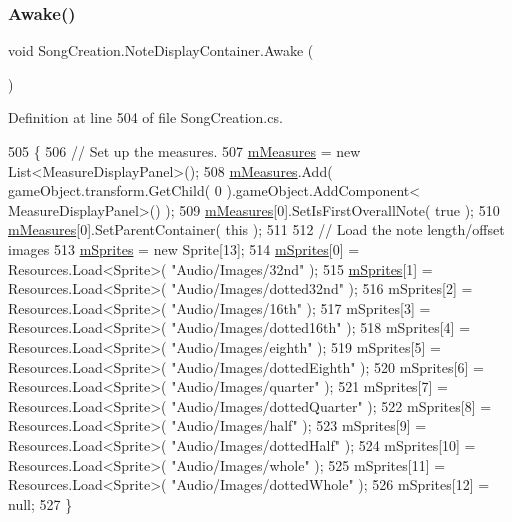 \subsubsection{\texorpdfstring{Awake()}{Awake()}}
{\footnotesize\ttfamily void Song\+Creation.\+Note\+Display\+Container.\+Awake (\begin{DoxyParamCaption}{ }\end{DoxyParamCaption})\hspace{0.3cm}{\ttfamily [private]}}



Definition at line 504 of file Song\+Creation.\+cs.


\begin{DoxyCode}
505         \{
506             \textcolor{comment}{// Set up the measures.}
507             \hyperlink{class_song_creation_1_1_note_display_container_a19c1c32db579c642fbc1b5bce0c80e7a}{mMeasures} = \textcolor{keyword}{new} List<MeasureDisplayPanel>();
508             \hyperlink{class_song_creation_1_1_note_display_container_a19c1c32db579c642fbc1b5bce0c80e7a}{mMeasures}.Add( gameObject.transform.GetChild( 0 ).gameObject.AddComponent<
      MeasureDisplayPanel>() );
509             \hyperlink{class_song_creation_1_1_note_display_container_a19c1c32db579c642fbc1b5bce0c80e7a}{mMeasures}[0].SetIsFirstOverallNote( \textcolor{keyword}{true} );
510             \hyperlink{class_song_creation_1_1_note_display_container_a19c1c32db579c642fbc1b5bce0c80e7a}{mMeasures}[0].SetParentContainer( \textcolor{keyword}{this} );
511 
512             \textcolor{comment}{// Load the note length/offset images}
513             \hyperlink{class_song_creation_1_1_note_display_container_ab8dbbd27a233f83f0402608e15699ecf}{mSprites} = \textcolor{keyword}{new} Sprite[13];
514             \hyperlink{class_song_creation_1_1_note_display_container_ab8dbbd27a233f83f0402608e15699ecf}{mSprites}[0] = Resources.Load<Sprite>( \textcolor{stringliteral}{"Audio/Images/32nd"} );
515             \hyperlink{class_song_creation_1_1_note_display_container_ab8dbbd27a233f83f0402608e15699ecf}{mSprites}[1] = Resources.Load<Sprite>( \textcolor{stringliteral}{"Audio/Images/dotted32nd"} );
516             mSprites[2] = Resources.Load<Sprite>( \textcolor{stringliteral}{"Audio/Images/16th"} );
517             mSprites[3] = Resources.Load<Sprite>( \textcolor{stringliteral}{"Audio/Images/dotted16th"} );
518             mSprites[4] = Resources.Load<Sprite>( \textcolor{stringliteral}{"Audio/Images/eighth"} );
519             mSprites[5] = Resources.Load<Sprite>( \textcolor{stringliteral}{"Audio/Images/dottedEighth"} );
520             mSprites[6] = Resources.Load<Sprite>( \textcolor{stringliteral}{"Audio/Images/quarter"} );
521             mSprites[7] = Resources.Load<Sprite>( \textcolor{stringliteral}{"Audio/Images/dottedQuarter"} );
522             mSprites[8] = Resources.Load<Sprite>( \textcolor{stringliteral}{"Audio/Images/half"} );
523             mSprites[9] = Resources.Load<Sprite>( \textcolor{stringliteral}{"Audio/Images/dottedHalf"} );
524             mSprites[10] = Resources.Load<Sprite>( \textcolor{stringliteral}{"Audio/Images/whole"} );
525             mSprites[11] = Resources.Load<Sprite>( \textcolor{stringliteral}{"Audio/Images/dottedWhole"} );
526             mSprites[12] = null;
527         \}
\end{DoxyCode}

